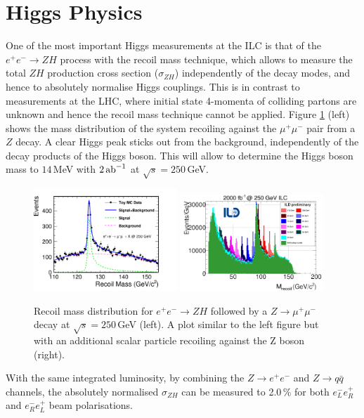 \section{Higgs Physics}
One of the most important Higgs measurements at the ILC is that of the $e^+e^- \to ZH$ process with the recoil mass technique, which allows to measure the total $ZH$ production cross section ($\sigma_{ZH}$) independently of the decay modes, and hence to absolutely normalise Higgs couplings. This is in contrast to measurements at the LHC, where initial state 4-momenta of colliding partons are unknown and hence the recoil mass technique cannot be applied. Figure \ref{fig:Mhrecoilmm} (left) shows the mass distribution of the system recoiling against the $\mu^+\mu^-$ pair from a $Z$ decay\cite{Yan:2016xyx}. A clear Higgs peak sticks out from the background, independently of the decay products of the Higgs boson. This will allow to determine the Higgs boson mass to $14$\,MeV with $2\,{\rm ab}^{-1}$ at $\sqrt{s}=250$\,GeV.
\begin{figure}[htbp]
\begin{center}
 \includegraphics[width=0.48\textwidth]{Science/fig/RecoilMassLep250.pdf}\hspace{2mm}
 \includegraphics[width=0.48\textwidth]{Science/fig/po_muon_kcut_recoil_mass_summary1.png}
\end{center}
\caption{Recoil mass distribution for $e^+e^- \to ZH$ followed by a $Z \to \mu^+\mu^-$ decay at $\sqrt{s}=250\,$GeV (left). A plot similar to the left figure but with an additional scalar particle recoiling against the Z boson (right). 
}
\label{fig:Mhrecoilmm}
\end{figure}
With the same integrated luminosity, by combining the $Z \to e^+e^-$ and $Z \to q\bar{q}$ channels, the absolutely normalised $\sigma_{ZH}$ can be measured to 2.0\,\% for both $e^-_Le^+_R$ and $e^-_Re^+_L$ beam polarisations.  


